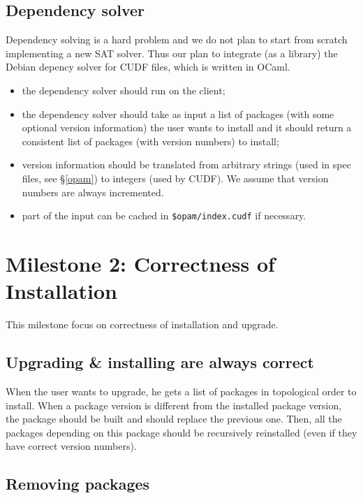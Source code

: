 \documentclass[a4paper,11pt]{article}
\begin{document}
\subsection{Dependency solver}
\label{deps}

Dependency solving is a hard problem and we do not plan to start from
scratch implementing a new SAT solver. Thus our plan to integrate (as
a library) the Debian depency solver for CUDF files, which is written
in OCaml.

\begin{itemize}
\item the dependency solver should run on the client;
\item the dependency solver should take as input a list of packages
  (with some optional version information) the user wants to install
  and it should return a consistent list of packages (with version
  numbers) to install;
\item version information should be translated from arbitrary strings
  (used in spec files, see \S\ref{opam}) to integers (used by
  CUDF). We assume that version numbers are always incremented.
\item part of the input can be cached in {\tt \$opam/index.cudf}
  if necessary.
\end{itemize}

\section{Milestone 2: Correctness of Installation}

This milestone focus on correctness of installation and upgrade.

\subsection{Upgrading \& installing are always correct}

When the user wants to upgrade, he gets a list of packages in
topological order to install. When a package version is different from
the installed package version, the package should be built and should
replace the previous one. Then, all the packages depending on this
package should be recursively reinstalled (even if they have correct
version numbers).

\subsection{Removing packages}
\end{document}
